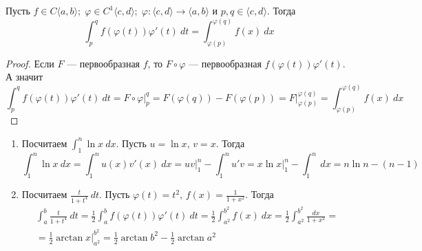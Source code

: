 \begin{theorem}
    Пусть $f \in C\langle a, b \rangle;\; \varphi \in C^{1}\langle c, d\rangle;\; \varphi\colon \langle c, d\rangle \to \langle a, b \rangle$ и $p, q \in \langle c, d \rangle$. Тогда
    \begin{equation*}
    \int_{p}^{q} f(\varphi(t))\varphi'(t) \: dt = \int_{\varphi(p)}^{\varphi(q)} f(x) \: dx
    \end{equation*}
\end{theorem}
\begin{proof}
    Если $F$ --- первообразная $f$, то $F \circ \varphi$ --- первообразная $f(\varphi(t))\varphi'(t)$. А значит
    \begin{equation*}
      \int_{p}^{q} f(\varphi(t))\varphi'(t) \: dt =
      F \circ \varphi \big|_{p}^{q} =
      F(\varphi(q)) - F(\varphi(p)) =
      F \big|_{\varphi(p)}^{\varphi(q)} =
      \int_{\varphi(p)}^{\varphi(q)} f(x) \: dx
    \end{equation*}
\end{proof}

\begin{examples}
  \begin{enumerate}
    \item
      Посчитаем $\displaystyle \int_{1}^{n} \ln x \: dx$. Пусть $u = \ln x,\, v = x$. Тогда
      \begin{equation*}
        \int_{1}^{n} \ln x \: dx = \int_{1}^{n} u(x)v'(x) \: dx = uv \big|_{1}^{n} - \int_{1}^{n} u'v = x\ln x \big|_{1}^{n} - \int_{1}^{n} \: dx = n \ln n - (n - 1)
      \end{equation*}
    \item
      Посчитаем $\displaystyle \frac{t}{1 + t^4} \: dt$. Пусть $\varphi(t) = t^2,\, f(x) = \frac{1}{1 + x^2}$. Тогда
      \begin{equation*}
        \begin{gathered}
          \int_{a}^{b} \frac{t}{1 + t^4} \: dt =
          \frac{1}{2}\int_{a}^{b} f(\varphi(t))\varphi'(t) \: dt =
          \frac{1}{2} \int_{a^2}^{b^2} f(x) \: dx =
          \frac{1}{2} \int_{a^2}^{b^2} \frac{dx}{1 + x^2}
          = \\ =
          \frac{1}{2} \arctan x \big|_{a^2}^{b^2} =
          \frac{1}{2} \arctan b^2 - \frac{1}{2} \arctan a^2
        \end{gathered}
      \end{equation*}
  \end{enumerate}
\end{examples}